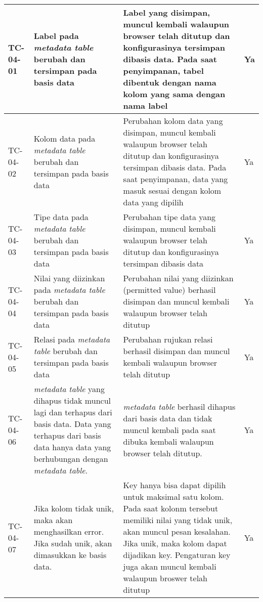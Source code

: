 \begin{small}
\begin{longtable}{ | p{2cm} | p{4cm} | p{4cm} | p{2cm} | }
	\\ \hline TC-04-01 & Label pada \textit{metadata table} berubah dan tersimpan pada basis data & Label yang disimpan, muncul kembali walaupun browser telah ditutup dan konfigurasinya tersimpan dibasis data. Pada saat penyimpanan, tabel dibentuk dengan nama kolom yang sama dengan nama label & Ya
	\\ \hline TC-04-02 & Kolom data pada \textit{metadata table} berubah dan tersimpan pada basis data & Perubahan kolom data yang disimpan, muncul kembali walaupun browser telah ditutup dan konfigurasinya tersimpan dibasis data. Pada saat penyimpanan, data yang masuk sesuai dengan kolom data yang dipilih & Ya
	\\ \hline TC-04-03 & Tipe data pada \textit{metadata table} berubah dan tersimpan pada basis data & Perubahan tipe data yang disimpan, muncul kembali walaupun browser telah ditutup dan konfigurasinya tersimpan dibasis data & Ya
	\\ \hline TC-04-04 & Nilai yang diizinkan pada \textit{metadata table} berubah dan tersimpan pada basis data & Perubahan nilai yang diizinkan (permitted value) berhasil disimpan dan muncul kembali walaupun browser telah ditutup & Ya
	\\ \hline TC-04-05 & Relasi pada \textit{metadata table} berubah dan tersimpan pada basis data & Perubahan rujukan relasi berhasil disimpan dan muncul kembali walaupun browser telah ditutup & Ya
	\\ \hline TC-04-06 & \textit{metadata table} yang dihapus tidak muncul lagi dan terhapus dari basis data. Data yang terhapus dari basis data hanya data yang berhubungan dengan \textit{metadata table}. & \textit{metadata table} berhasil dihapus dari basis data dan tidak muncul kembali pada saat dibuka kembali walaupun browser telah ditutup. & Ya
	\\ \hline TC-04-07 & Jika kolom tidak unik, maka akan menghasilkan error. Jika sudah unik, akan dimasukkan ke basis data. & Key hanya bisa dapat dipilih untuk maksimal satu kolom. Pada saat kolonm tersebut memiliki nilai yang tidak unik, akan muncul pesan kesalahan. Jika unik, maka kolom dapat dijadikan key. Pengaturan key juga akan muncul kembali walaupun broswer telah ditutup & Ya


\end{longtable}
\end{small}

